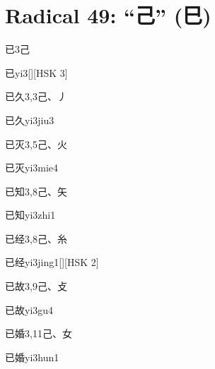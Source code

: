 
\section*{Radical 49: ``⼰'' (⺒)}

\begin{Entry}{已}{3}{⼰}
  \begin{Phonetics}{已}{yi3}[][HSK 3]
  \end{Phonetics}
\end{Entry}

\begin{Entry}{已久}{3,3}{⼰、⼃}
  \begin{Phonetics}{已久}{yi3jiu3}
  \end{Phonetics}
\end{Entry}

\begin{Entry}{已灭}{3,5}{⼰、⽕}
  \begin{Phonetics}{已灭}{yi3mie4}
  \end{Phonetics}
\end{Entry}

\begin{Entry}{已知}{3,8}{⼰、⽮}
  \begin{Phonetics}{已知}{yi3zhi1}
  \end{Phonetics}
\end{Entry}

\begin{Entry}{已经}{3,8}{⼰、⽷}
  \begin{Phonetics}{已经}{yi3jing1}[][HSK 2]
  \end{Phonetics}
\end{Entry}

\begin{Entry}{已故}{3,9}{⼰、⽁}
  \begin{Phonetics}{已故}{yi3gu4}
  \end{Phonetics}
\end{Entry}

\begin{Entry}{已婚}{3,11}{⼰、⼥}
  \begin{Phonetics}{已婚}{yi3hun1}
  \end{Phonetics}
\end{Entry}

